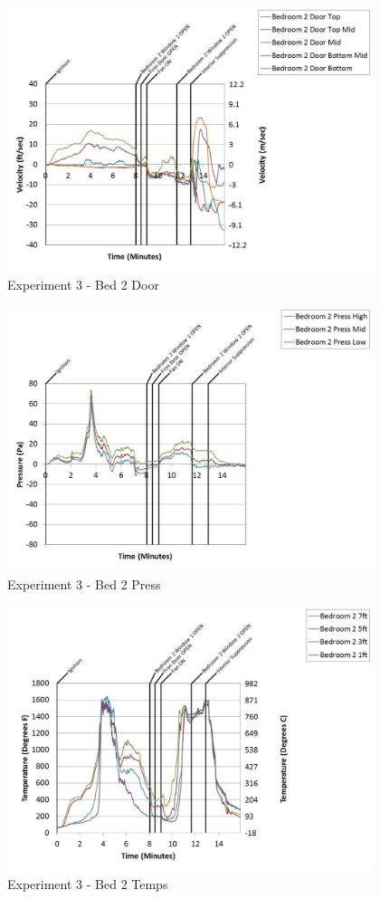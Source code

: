 \documentclass{article}
\begin{document}
\begin{appendices}
	\clearpage

	\begin{figure}[h!]
		\centering
		\includegraphics[height=3.05in]{0_Images/Results_Charts/Exp_3_Charts/Bed2Door.pdf}
		\caption{Experiment 3 - Bed 2 Door}
	\end{figure}
 

	\begin{figure}[h!]
		\centering
		\includegraphics[height=3.05in]{0_Images/Results_Charts/Exp_3_Charts/Bed2Press.pdf}
		\caption{Experiment 3 - Bed 2 Press}
	\end{figure}
 
	\clearpage

	\begin{figure}[h!]
		\centering
		\includegraphics[height=3.05in]{0_Images/Results_Charts/Exp_3_Charts/Bed2Temps.pdf}
		\caption{Experiment 3 - Bed 2 Temps}
	\end{figure}
 


\end{appendices}
\end{document}
